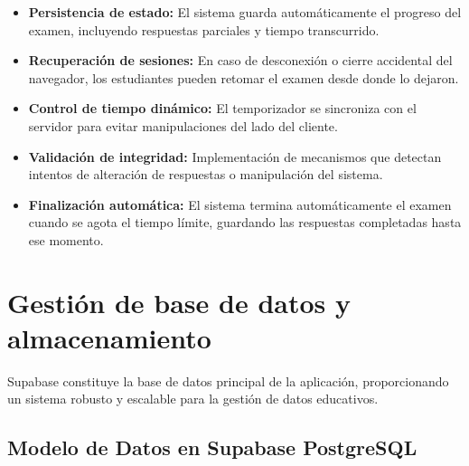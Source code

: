 \documentclass[12pt,a4paper]{report}
\begin{document}
\begin{itemize}
\item \textbf{Persistencia de estado:} El sistema guarda automáticamente el progreso del examen, incluyendo respuestas parciales y tiempo transcurrido.

\item \textbf{Recuperación de sesiones:} En caso de desconexión o cierre accidental del navegador, los estudiantes pueden retomar el examen desde donde lo dejaron.

\item \textbf{Control de tiempo dinámico:} El temporizador se sincroniza con el servidor para evitar manipulaciones del lado del cliente.

\item \textbf{Validación de integridad:} Implementación de mecanismos que detectan intentos de alteración de respuestas o manipulación del sistema.

\item \textbf{Finalización automática:} El sistema termina automáticamente el examen cuando se agota el tiempo límite, guardando las respuestas completadas hasta ese momento.
\end{itemize}

\section{Gestión de base de datos y almacenamiento}

Supabase constituye la base de datos principal de la aplicación, proporcionando un sistema robusto y escalable para la gestión de datos educativos.

\subsection{Modelo de Datos en Supabase PostgreSQL}
\end{document}
